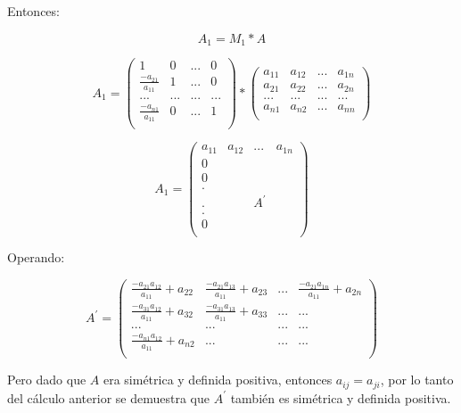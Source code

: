Entonces:

$$
A_1 = M_1*A
$$

$$
A_1 = \begin{pmatrix}
    1 & 0 & ... & 0 \\
    \frac{-a_{21}}{a_{11}} & 1 & ... & 0 \\
    ... & ... & ... & ... \\
    \frac{-a_{n1}}{a_{11}} & 0 & ... & 1 \\
\end{pmatrix} * \begin{pmatrix}
    a_{11} & a_{12} & ... & a_{1n} \\
    a_{21} & a_{22} & ... & a_{2n} \\
    ... & ... & ... & ... \\
    a_{n1} & a_{n2} & ... & a_{nn} \\
\end{pmatrix}
$$

$$
A_1 = \begin{pmatrix}
            a_{11} & a_{12} & ... & a_{1n} \\ 
            0 & & & \\
            0 & & & \\
            . & & & \\
            . & & A^{'} & \\
            . & & & \\
            0 & & & \\
        \end{pmatrix}
$$

Operando:

$$
A^{'} = \begin{pmatrix}
    \frac{-a_{21}a_{12}}{a_{11}}+a_{22} & \frac{-a_{21}a_{13}}{a_{11}}+a_{23} & ... & \frac{-a_{21}a_{1n}}{a_{11}}+a_{2n} \\
    \frac{-a_{31}a_{12}}{a_{11}}+a_{32} & \frac{-a_{31}a_{13}}{a_{11}}+a_{33} & ... & ...\\
    ... & ... & ... & ... \\
    \frac{-a_{n1}a_{12}}{a_{11}}+a_{n2} & ... & ... & ... \\
\end{pmatrix}
$$

Pero dado que $A$ era simétrica y definida positiva, entonces $a_{ij}=a_{ji}$, por lo tanto del cálculo anterior se demuestra que $A^{'}$  también es simétrica y definida positiva.

